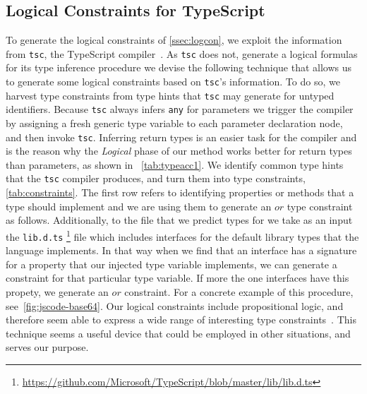 \documentclass[acmsmall, review, anonymous]{acmart}\settopmatter{printfolios=true,printccs=false,printacmref=false}
\begin{document}
\subsection{Logical Constraints for TypeScript}\label{ssec:logprodts}
To generate the logical constraints of \cref{ssec:logcon}, we exploit the information from \lstinline+tsc+, the TypeScript compiler~\cite{typescript}. 
As \lstinline+tsc+ does not, generate a logical formulas 
for its type inference procedure we devise the following technique that allows us to generate some logical constraints based on \lstinline+tsc+'s information. To do so, we harvest type constraints from type hints that \lstinline+tsc+ may generate
for untyped identifiers. Because \lstinline+tsc+ always infers \texttt{\small{any}} for parameters we trigger
the compiler by assigning a fresh generic type variable to each parameter declaration node, and then invoke \lstinline+tsc+. 
Inferring return types is an easier task for the compiler and is the reason why the \textit{Logical} phase of our method works better for return types than parameters, as shown in ~\cref{tab:typeacc1}. 
We identify common type hints that the \lstinline+tsc+ compiler produces, and turn them into type constraints, \cref{tab:constraints}. The first row 
refers to identifying properties or methods that a type should implement
and we are using them to generate an $\mathrel{or}$ type constraint as follows. Additionally, to the file that we 
predict types for we take as an input the \lstinline{lib.d.ts} \footnote{\url{https://github.com/Microsoft/TypeScript/blob/master/lib/lib.d.ts}} file which includes interfaces for the default library types that the language implements. In that way when we find that an interface has a signature for a property that our injected type variable implements, we can generate a constraint for that particular type variable. If more the one interfaces have this propety, we generate an $\mathrel{or}$ constraint.
For a concrete example of this procedure, 
see~\cref{fig:jscode-base64}.
Our logical constraints include propositional logic, and therefore seem able to express a wide range of interesting type constraints~\citep{odersky99,pottier05}.
%
This technique seems a useful device that could be employed in other situations, and serves our purpose.
\end{document}
